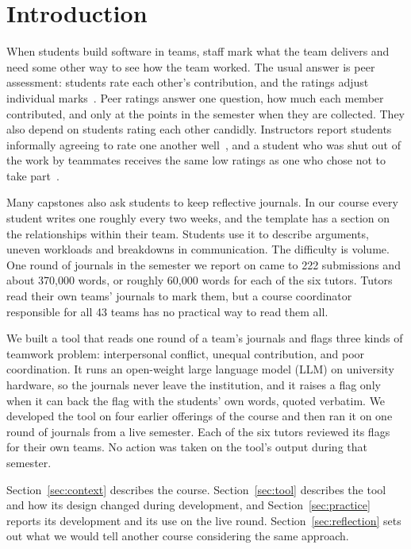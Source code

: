 \section{Introduction}
\label{sec:intro}

When students build software in teams, staff mark what the team delivers and need some
other way to see how the team worked. The usual answer is peer assessment: students rate
each other's contribution, and the ratings adjust individual
marks~\cite{kaufman2000accounting,ohland2012catme}. Peer ratings answer one question, how
much each member contributed, and only at the points in the semester when they are
collected. They also depend on students rating each other candidly. Instructors report
students informally agreeing to rate one another
well~\cite{hooshangi2025assessment}, and a student who was shut out of the work by
teammates receives the same low ratings as one who chose not to take
part~\cite{hall2013freeriding}.

Many capstones also ask students to keep reflective journals. In our course every student
writes one roughly every two weeks, and the template has a section on the relationships
within their team. Students use it to describe arguments, uneven workloads and breakdowns
in communication. The difficulty is volume. One round of journals in the semester we report
on came to 222 submissions and about 370,000 words, or roughly 60,000 words for each of
the six tutors. Tutors read their own teams' journals to mark them, but a course
coordinator responsible for all 43 teams has no practical way to read them all.

We built a tool that reads one round of a team's journals and flags three kinds of
teamwork problem: interpersonal conflict, unequal contribution, and poor coordination.
It runs an open-weight large language model (LLM) on university hardware, so the journals never
leave the institution, and it raises a flag only when it can back the flag with the
students' own words, quoted verbatim. We developed the tool on four earlier offerings of
the course and then ran it on one round of journals from a live semester. Each of the six
tutors reviewed its flags for their own teams. No action was taken on the tool's output
during that semester.

Section~\ref{sec:context} describes the course. Section~\ref{sec:tool} describes the tool
and how its design changed during development, and Section~\ref{sec:practice} reports its
development and its use on the live round. Section~\ref{sec:reflection} sets out what we
would tell another course considering the same approach.
